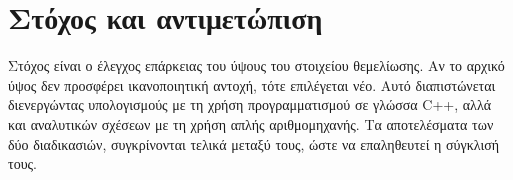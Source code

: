 \section{Στόχος και αντιμετώπιση}
Στόχος είναι ο έλεγχος επάρκειας του ύψους του στοιχείου θεμελίωσης. Αν το αρχικό ύψος δεν προσφέρει ικανοποιητική αντοχή, τότε επιλέγεται νέο. Αυτό διαπιστώνεται διενεργώντας υπολογισμούς με τη χρήση προγραμματισμού σε γλώσσα \textlatin{C++}, αλλά και αναλυτικών σχέσεων με τη χρήση απλής αριθμομηχανής. Τα αποτελέσματα των δύο διαδικασιών, συγκρίνονται τελικά μεταξύ τους, ώστε να επαληθευτεί η σύγκλισή τους.
